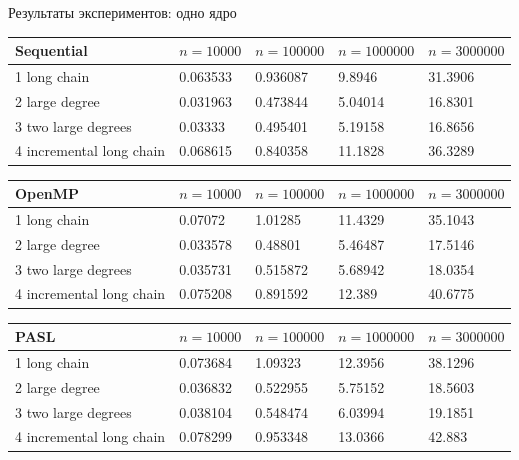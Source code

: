 \documentclass[hyperref=unicode,graphics=pdflatex,13pt]{beamer}
\begin{document}
\begin{frame}[shrink]{Результаты экспериментов: одно ядро}

\begin{table}[!ht]
\centering
\begin{tabular}{|l|l|l|l|l|}\hline
Sequential	& $n=10000$ & $n=100000$ & $n=1000000$ & $n=3000000$ \\\hline
1 long chain & 0.063533	& 0.936087 & 9.8946 & 31.3906 \\\hline
2 large degree & 0.031963 & 0.473844 & 5.04014 & 16.8301 \\\hline
3 two large degrees & 0.03333 & 0.495401 & 5.19158 & 16.8656 \\\hline
4 incremental long chain & 0.068615 & 0.840358 & 11.1828 & 36.3289 \\\hline
\end{tabular}
\end{table}

\begin{table}[!ht]
\centering
\begin{tabular}{|l|l|l|l|l|}\hline
OpenMP	& $n=10000$ & $n=100000$ & $n=1000000$ & $n=3000000$ \\\hline
1 long chain & 0.07072 & 1.01285 & 11.4329 & 35.1043 \\\hline
2 large degree & 0.033578 & 0.48801 & 5.46487 & 17.5146 \\\hline
3 two large degrees & 0.035731 & 0.515872 & 5.68942 & 18.0354 \\\hline
4 incremental long chain & 0.075208 & 0.891592 & 12.389 & 40.6775 \\\hline
\end{tabular}
\end{table}

\begin{table}[!ht]
\centering
\begin{tabular}{|l|l|l|l|l|}\hline
PASL	& $n=10000$ & $n=100000$ & $n=1000000$ & $n=3000000$ \\\hline
1 long chain & 0.073684	& 1.09323 & 12.3956 & 38.1296 \\\hline
2 large degree & 0.036832 & 0.522955 & 5.75152 & 18.5603 \\\hline
3 two large degrees & 0.038104 & 0.548474 & 6.03994 & 19.1851 \\\hline
4 incremental long chain & 0.078299 & 0.953348 & 13.0366 & 42.883 \\\hline
\end{tabular}
\end{table}
\end{frame}
\end{document}
